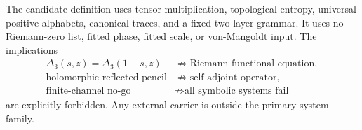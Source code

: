 The candidate definition uses tensor multiplication, topological entropy,
universal positive alphabets, canonical traces, and a fixed two-layer
grammar.  It uses no Riemann-zero list, fitted phase, fitted scale, or
von-Mangoldt input.  The implications
\begin{align*}
 \Delta_3(s,z)=\Delta_3(1-s,z)&\not\Rightarrow
 \text{Riemann functional equation},\\
 \text{holomorphic reflected pencil}&\not\Rightarrow
 \text{self-adjoint operator},\\
 \text{finite-channel no-go}&\not\Rightarrow
 \text{all symbolic systems fail}
\end{align*}
are explicitly forbidden.  Any external carrier is outside the primary
system family.
